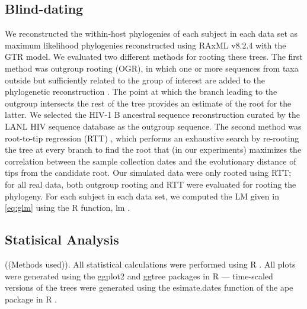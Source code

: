 \documentclass[9pt,twocolumn,twoside,lineno]{pnas-new}
\begin{document}
{\subsection*{Blind-dating}
We reconstructed the within-host phylogenies of each subject in each data set as maximum likelihood phylogenies reconstructed using RAxML v8.2.4 \cite{raxml} with the GTR model.
We evaluated two different methods for rooting these trees. 
The first method was outgroup rooting (OGR), in which one or more sequences from taxa outside but sufficiently related to the group of interest are added to the phylogenetic reconstruction \cite{Huelsenbeck02}.
The point at which the branch leading to the outgroup intersects the rest of the tree provides an estimate of the root for the latter.
We selected the HIV-1 B ancestral sequence reconstruction curated by the LANL HIV sequence database as the outgroup sequence.
The second method was root-to-tip regression (RTT) \cite{Korber00}, which performs an exhaustive search by re-rooting the tree at every branch to find the root that (in our experiments) maximizes the correlation between the sample collection dates and the evolutionary distance of tips from the candidate root.
Our simulated data were only rooted using RTT; for all real data, both outgroup rooting and RTT were evaluated for rooting the phylogeny.
For each subject in each data set, we computed the LM given in \cref{eq:glm} using the R function, lm \cite{rscript}.
\subsection*{Statisical Analysis}
((Methods used)).
All statistical calculations were performed using R \cite{rscript}.
All plots were generated using the ggplot2 and ggtree packages in R \cite{ggplot,ggtree} --- time-scaled versions of the trees were generated using the esimate.dates function of the ape package in R \cite{ape,nodedating}.
}

\showmatmethods{} %



\pnasbreak{}


\end{document}

